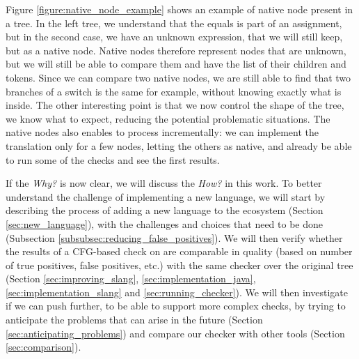 Figure \ref{figure:native_node_example} shows an example of native node present in a \slang{} tree. In the left tree, we understand that the equals is part of an assignment, but in the second case, we have an unknown expression, that we will still keep, but as a native node.
Native nodes therefore represent nodes that are unknown, but we will still be able to compare them and have the list of their children and tokens. 
Since we can compare two native nodes, we are still able to find that two branches of a switch is the same for example, without knowing exactly what is inside. 
The other interesting point is that we now control the shape of the tree, we know what to expect, reducing the potential problematic situations.
The native nodes also enables to process incrementally: we can implement the translation only for a few nodes, letting the others as native, and already be able to run some of the checks and see the first results.


If the \emph{Why?} is now clear, we will discuss the \emph{How?} in this work. 
To better understand the challenge of implementing a new language, we will start by describing the process of adding a new language to the ecosystem (Section \ref{sec:new_language}), with the challenges and choices that need to be done (Subsection \ref{subsubsec:reducing_false_positives}). 
We will then verify whether the results of a CFG-based check on \slang{} are comparable in quality (based on number of true positives, false positives, etc.) with the same checker over the original tree (Section \ref{sec:improving_slang}, \ref{sec:implementation_java}, \ref{sec:implementation_slang} and \ref{sec:running_checker}).
We will then investigate if we can push \slang{} further, to be able to support more complex checks, by trying to anticipate the problems that can arise in the future (Section \ref{sec:anticipating_problems}) and compare our checker with other tools (Section \ref{sec:comparison}).




